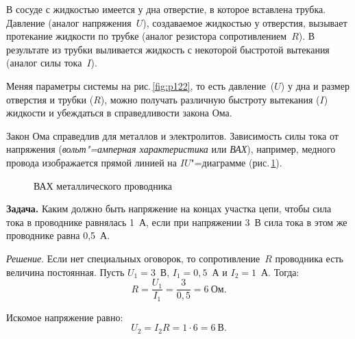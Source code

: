 \documentclass[main.tex]{subfiles}
\begin{document}
\begin{NoHyper}
В сосуде с жидкостью имеется у дна отверстие, в которое вставлена трубка. Давление (аналог напряжения~$U$), создаваемое жидкостью у отверстия, вызывает протекание жидкости по трубке (аналог резистора сопротивлением~$R$). В результате из трубки выливается жидкость с некоторой быстротой вытекания (аналог силы тока~$I$). 

Меняя параметры системы на рис.\,\ref{fig:p122}, то есть давление~($U$) у дна и размер отверстия и трубки ($R$), можно получать различную быстроту вытекания ($I$) жидкости и убеждаться в справедливости закона Ома.


Закон Ома справедлив для металлов и электролитов. Зависимость силы тока от напряжения (\emph{вольт"=амперная характеристика} или \emph{ВАХ}), например, медного провода изображается прямой линией на $IU$"=диаграмме (рис.\,\ref{fig:p123}).  

\begin{figure}[H]
    \centering

\caption{ВАХ металлического проводника}
\label{fig:p123}
\end{figure}


\noindent\textbf{Задача.} Каким должно быть напряжение на концах участка цепи, чтобы сила тока в проводнике равнялась 1~А, если при напряжении 3~В сила тока в этом же проводнике равна 0,5~А.

\smallskip

\noindent\emph{Решение}. Если нет специальных оговорок, то сопротивление~$R$ проводника есть величина постоянная. Пусть $U_1=3$~В, $I_1=0{,}5$~А и $I_2=1$~А. Тогда:
\begin{equation*}
    R=\frac{U_1}{I_1}=\frac{3}{0{,}5}=6~\text{Ом}.
\end{equation*}

Искомое напряжение равно:
\begin{equation*}
    U_2=I_2R=1\cdot6=6~\text{В}.
\end{equation*}



\end{NoHyper}
\end{document}
